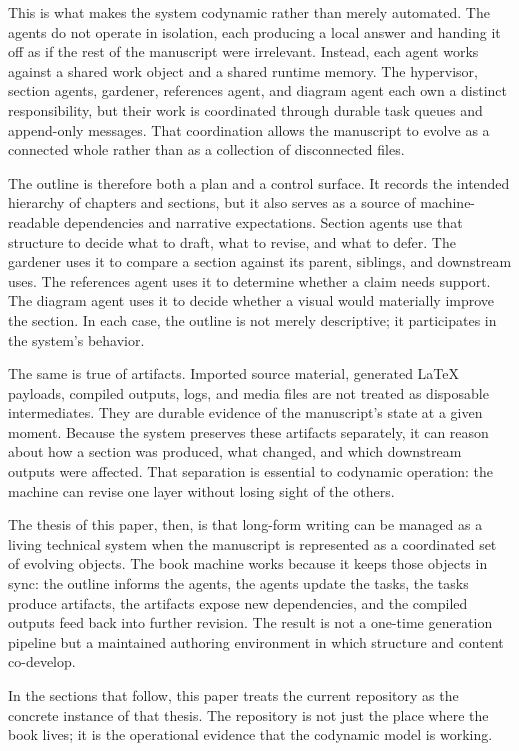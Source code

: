 \documentclass[11pt]{article}
\begin{document}
This is what makes the system codynamic rather than merely automated. The agents do not operate in isolation, each producing a local answer and handing it off as if the rest of the manuscript were irrelevant. Instead, each agent works against a shared work object and a shared runtime memory. The hypervisor, section agents, gardener, references agent, and diagram agent each own a distinct responsibility, but their work is coordinated through durable task queues and append-only messages. That coordination allows the manuscript to evolve as a connected whole rather than as a collection of disconnected files.

The outline is therefore both a plan and a control surface. It records the intended hierarchy of chapters and sections, but it also serves as a source of machine-readable dependencies and narrative expectations. Section agents use that structure to decide what to draft, what to revise, and what to defer. The gardener uses it to compare a section against its parent, siblings, and downstream uses. The references agent uses it to determine whether a claim needs support. The diagram agent uses it to decide whether a visual would materially improve the section. In each case, the outline is not merely descriptive; it participates in the system's behavior.

The same is true of artifacts. Imported source material, generated LaTeX payloads, compiled outputs, logs, and media files are not treated as disposable intermediates. They are durable evidence of the manuscript's state at a given moment. Because the system preserves these artifacts separately, it can reason about how a section was produced, what changed, and which downstream outputs were affected. That separation is essential to codynamic operation: the machine can revise one layer without losing sight of the others.

The thesis of this paper, then, is that long-form writing can be managed as a living technical system when the manuscript is represented as a coordinated set of evolving objects. The book machine works because it keeps those objects in sync: the outline informs the agents, the agents update the tasks, the tasks produce artifacts, the artifacts expose new dependencies, and the compiled outputs feed back into further revision. The result is not a one-time generation pipeline but a maintained authoring environment in which structure and content co-develop.

In the sections that follow, this paper treats the current repository as the concrete instance of that thesis. The repository is not just the place where the book lives; it is the operational evidence that the codynamic model is working.
\end{document}
